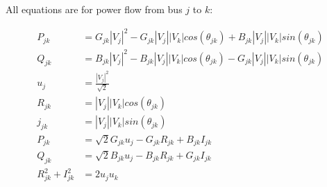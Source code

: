 \documentclass[10pt,a4paper]{article}
\begin{document}
		All equations are for power flow from bus $j$ to $k$:
		
		\begin{align}
			P_{jk} &= G_{jk}|V_j|^2 - G_{jk}|V_j||V_k|cos(\theta_{jk}) + B_{jk}|V_j||V_k|sin(\theta_{jk}) \\
			Q_{jk} &= B_{jk}|V_j|^2 - B_{jk}|V_j||V_k|cos(\theta_{jk}) - G_{jk}|V_j||V_k|sin(\theta_{jk}) \\[10pt]
			u_j &= \frac{|V_j|^2}{\sqrt{2}} \nonumber\\[10pt]
			R_{jk} &= |V_j||V_k|cos(\theta_{jk}) \nonumber\\
			j_{jk} &= |V_j||V_k|sin(\theta_{jk}) \nonumber\\[10pt]
			P_{jk} &= \sqrt{2}G_{jk}u_j - G_{jk}R_{jk} + B_{jk}I_{jk} \\
			Q_{jk} &= \sqrt{2}B_{jk}u_j - B_{jk}R_{jk} + G_{jk}I_{jk} \\
			R_{jk}^2 + I_{jk}^2 &= 2u_ju_k
		\end{align} 
	
\end{document}

